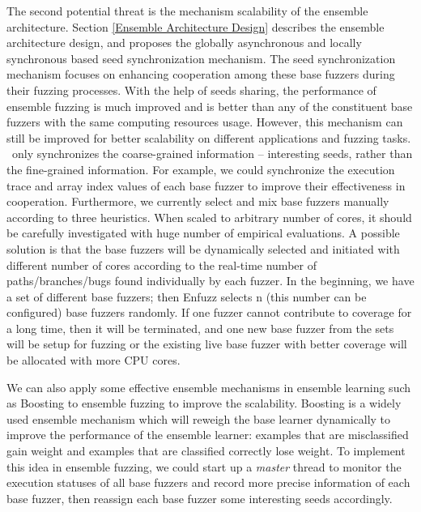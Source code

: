 The second potential threat is the mechanism scalability of the ensemble architecture. 
Section \ref{Ensemble Architecture Design} describes the ensemble architecture design, and proposes the globally asynchronous and locally synchronous based seed synchronization mechanism.
The seed synchronization mechanism focuses on enhancing cooperation among these base fuzzers during their fuzzing processes.
With the help of seeds sharing, the performance of ensemble fuzzing is much improved and is better than any of the constituent base fuzzers with the same computing resources usage.
However, this mechanism can still be improved for better scalability on different applications and fuzzing tasks. \EnFuzz ~only synchronizes the coarse-grained information -- interesting seeds, rather than the fine-grained information.
For example, we could synchronize the execution trace and array index values of each base fuzzer to improve their effectiveness in cooperation. 
Furthermore, we currently select and mix base fuzzers manually according to three heuristics. When scaled to arbitrary number of cores, it should be carefully investigated with huge number of empirical evaluations. A possible solution is that the base fuzzers will be dynamically selected and initiated with different number of cores according to the real-time number of paths/branches/bugs found individually by each fuzzer. In the beginning, we have a set of different base fuzzers; then Enfuzz selects n (this number can be configured) base fuzzers randomly. If one fuzzer cannot contribute to coverage for a long time, then it will be terminated, and one new base fuzzer from the sets will be setup for fuzzing or the existing live base fuzzer with better coverage will be allocated with more CPU cores. 



We can also apply some effective ensemble mechanisms in ensemble learning such as Boosting to ensemble fuzzing to improve the scalability.
Boosting is a widely used ensemble mechanism which will reweigh the base learner dynamically to improve the performance of the ensemble learner: examples that are misclassified gain weight and examples that are classified correctly lose weight.
To implement this idea in ensemble fuzzing, we could start up a \textit{master} thread to monitor the execution statuses of all base fuzzers and record more precise information of each base fuzzer, then reassign each base fuzzer some interesting seeds accordingly.

